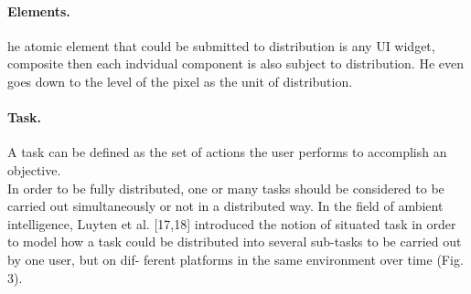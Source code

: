 \paragraph{Elements.} 
\cite{vanderdonckt2010distributed} he atomic element that could be submitted to
distribution is any UI widget, composite then each indvidual component is also
subject to distribution. He even goes down to the level of the pixel as the unit
of distribution.\\

\paragraph{Task.}
\cite{lopez2011formal} A task can be defined as the set of actions the user
performs to accomplish an objective.\\
\cite{vanderdonckt2010distributed} In order
to be fully distributed, one or many tasks should be considered to be carried out simultaneously or not in a distributed way. In the field of ambient
intelligence, Luyten et al. [17,18] introduced the notion of situated task in
order to model how a task could be distributed into several sub-tasks to be
carried out by one user, but on dif- ferent platforms in the same environment
over time (Fig. 3).\\

